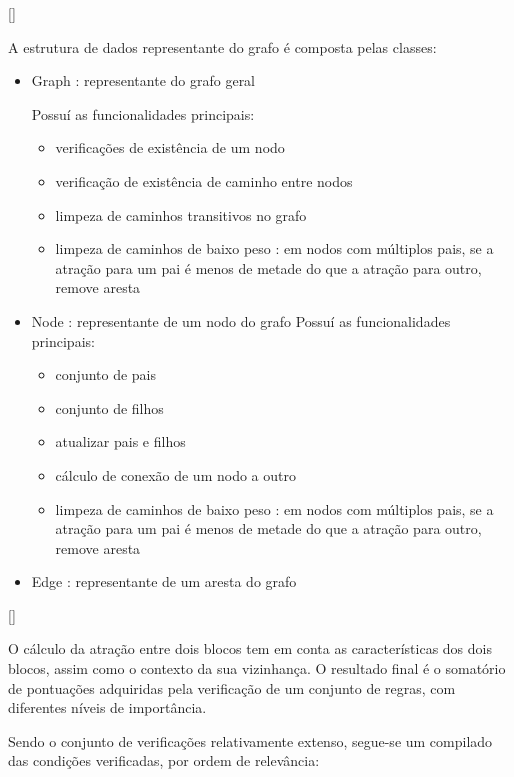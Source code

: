 [\normalsize]

A estrutura de dados representante do grafo é composta pelas classes:

\begin{itemize}\setlength\itemsep{-0.3em}
	\item Graph : representante do grafo geral
	
		Possuí as funcionalidades principais:
		\begin{itemize}\setlength\itemsep{-0.3em}
			\item verificações de existência de um nodo
			\item verificação de existência de caminho entre nodos
			\item limpeza de caminhos transitivos no grafo
			\item limpeza de caminhos de baixo peso : em nodos com múltiplos pais, se a atração para um pai é menos de metade do que a atração para outro, remove aresta
		\end{itemize}
	\item Node : representante de um nodo do grafo
		Possuí as funcionalidades principais:
		\begin{itemize}\setlength\itemsep{-0.3em}
			\item conjunto de pais
			\item conjunto de filhos
			\item atualizar pais e filhos
			\item cálculo de conexão de um nodo a outro
			\item limpeza de caminhos de baixo peso : em nodos com múltiplos pais, se a atração para um pai é menos de metade do que a atração para outro, remove aresta
		\end{itemize}
	\item Edge : representante de um aresta do grafo
\end{itemize}


[\normalsize]

O cálculo da atração entre dois blocos tem em conta as características dos dois blocos, assim como o contexto da sua vizinhança. O resultado final é o somatório de pontuações adquiridas pela verificação de um conjunto de regras, com diferentes níveis de importância. 

Sendo o conjunto de verificações relativamente extenso, segue-se um compilado das condições verificadas, por ordem de relevância:

